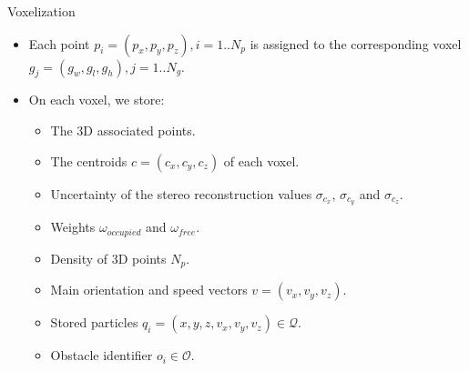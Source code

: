 \begin{frame}[t]{Voxelization}
  \begin{overlayarea}{\textwidth}{\textheight}
  \begin{itemize}
   \item Each point $p_i = (p_x, p_y, p_z), i=1..N_p$ is assigned to the corresponding voxel $g_j=(g_w, g_l, g_h), j=1..N_g$.
   \item On each voxel, we store:
   \begin{itemize}
    \item The 3D associated points.
    \item The centroids $c=(c_x, c_y, c_z)$ of each voxel.
    \item Uncertainty of the stereo reconstruction values $\sigma_{c_x}$, $\sigma_{c_y}$ and $\sigma_{c_z}$.
    \item Weights $\omega_{occupied}$ and $\omega_{free}$.
    \item Density of 3D points $N_p$.
    \item Main orientation and speed vectors $v=(v_x, v_y, v_z)$.
    \item Stored particles $q_i = (x, y, z, v_x, v_y, v_z) \in \mathcal{Q}$.
    \item Obstacle identifier $o_i \in \mathcal{O}$.
   \end{itemize}


\end{itemize}
\end{overlayarea}
\end{frame}
